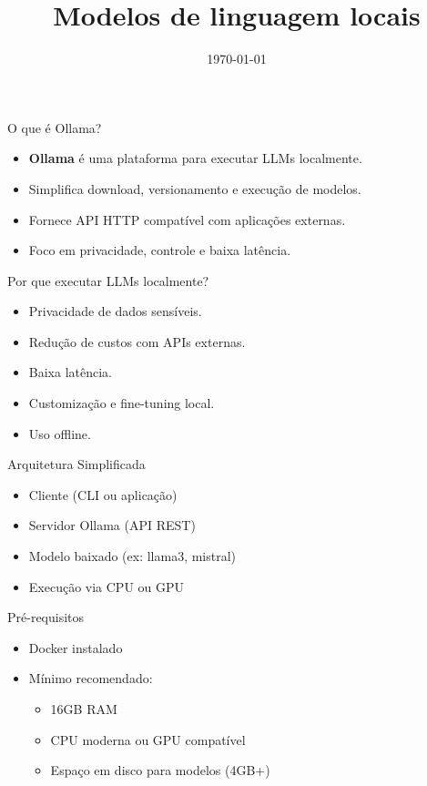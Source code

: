 \documentclass{beamer}
\title{Modelos de linguagem locais}
\date{\today}
\begin{document}
    
    

\begin{frame}{O que é Ollama?}
    \begin{itemize}
        \item \textbf{Ollama} é uma plataforma para executar LLMs localmente.
        \item Simplifica download, versionamento e execução de modelos.
        \item Fornece API HTTP compatível com aplicações externas.
        \item Foco em privacidade, controle e baixa latência.
    \end{itemize}
\end{frame}

\begin{frame}{Por que executar LLMs localmente?}
    \begin{itemize}
        \item Privacidade de dados sensíveis.
        \item Redução de custos com APIs externas.
        \item Baixa latência.
        \item Customização e fine-tuning local.
        \item Uso offline.
    \end{itemize}
\end{frame}

\begin{frame}{Arquitetura Simplificada}
    \begin{itemize}
        \item Cliente (CLI ou aplicação)
        \item Servidor Ollama (API REST)
        \item Modelo baixado (ex: llama3, mistral)
        \item Execução via CPU ou GPU
    \end{itemize}
\end{frame}

\begin{frame}{Pré-requisitos}
    \begin{itemize}
        \item Docker instalado
        \item Mínimo recomendado:
        \begin{itemize}
            \item 16GB RAM
            \item CPU moderna ou GPU compatível
            \item Espaço em disco para modelos (4GB+)
        \end{itemize}
    \end{itemize}
\end{frame}
\end{document}
